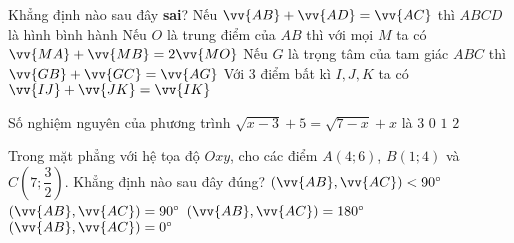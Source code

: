 \begin{ex}%
Khẳng định nào sau đây {\bf sai}?
\choice
{\True Nếu $\vv{AB}+\vv{AD}=\vv{AC}$ thì $ABCD$ là hình bình hành}
{Nếu $O$ là trung điểm của $AB$ thì với mọi $M$ ta có $\vv{MA}+\vv{MB}=2\vv{MO}$}
{Nếu $G$ là trọng tâm của tam giác $ABC$ thì $\vv{GB}+\vv{GC}=\vv{AG}$}
{Với 3 điểm bất kì $I,J,K$ ta có $\vv{IJ}+\vv{JK}=\vv{IK}$}
\end{ex}

\begin{ex}%
Số nghiệm nguyên của phương trình $\sqrt{x-3}+5=\sqrt{7-x}+x$ là
\choice
{\True $3$}
{$0$}
{$1$}
{$2$}
\end{ex}

\begin{ex}%
Trong mặt phẳng với hệ tọa độ $Oxy$, cho các điểm $A(4;6)$, $B(1;4)$ và $C\left(7;\dfrac{3}{2}\right)$. Khẳng định nào sau đây đúng?
\haicot
{$\left(\vv{AB},\vv{AC}\right)<90^\circ$}
{\True $\left(\vv{AB},\vv{AC}\right)=90^\circ$}
{$\left(\vv{AB},\vv{AC}\right)=180^\circ$}
{$\left(\vv{AB},\vv{AC}\right)=0^\circ$}
\end{ex}

